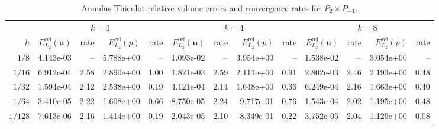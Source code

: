 \documentclass[10pt,a4paper]{article}
\begin{document}
\begin{table}[p]
\centering
\caption{Annulus Thieulot relative volume errors and convergence rates for $P_2\times P_{-1}$.}
\label{tab:annulus_thieulot_v2_p1_disc}
\small
\begin{tabular}{
r rr rr rr rr rr rr
}
\toprule
& \multicolumn{4}{c}{$k=1$} & \multicolumn{4}{c}{$k=4$} & \multicolumn{4}{c}{$k=8$} \\
\cmidrule(lr){2-5}\cmidrule(lr){6-9}\cmidrule(lr){10-13}
$h$ & $E_{L_2}^{\mathrm{rel}}(\mathbf{u})$ & rate & $E_{L_2}^{\mathrm{rel}}(p)$ & rate & $E_{L_2}^{\mathrm{rel}}(\mathbf{u})$ & rate & $E_{L_2}^{\mathrm{rel}}(p)$ & rate & $E_{L_2}^{\mathrm{rel}}(\mathbf{u})$ & rate & $E_{L_2}^{\mathrm{rel}}(p)$ & rate \\
\midrule
$1/8$ & 4.143e-03 & -- & 5.788e+00 & -- & 1.093e-02 & -- & 3.954e+00 & -- & 1.538e-02 & -- & 3.054e+00 & -- \\
$1/16$ & 6.912e-04 & 2.58 & 2.890e+00 & 1.00 & 1.821e-03 & 2.59 & 2.111e+00 & 0.91 & 2.802e-03 & 2.46 & 2.193e+00 & 0.48 \\
$1/32$ & 1.594e-04 & 2.12 & 2.538e+00 & 0.19 & 4.121e-04 & 2.14 & 1.648e+00 & 0.36 & 6.249e-04 & 2.16 & 1.663e+00 & 0.40 \\
$1/64$ & 3.410e-05 & 2.22 & 1.608e+00 & 0.66 & 8.750e-05 & 2.24 & 9.717e-01 & 0.76 & 1.543e-04 & 2.02 & 1.195e+00 & 0.48 \\
$1/128$ & 7.613e-06 & 2.16 & 1.414e+00 & 0.19 & 2.043e-05 & 2.10 & 8.349e-01 & 0.22 & 3.752e-05 & 2.04 & 1.129e+00 & 0.08 \\
\bottomrule
\end{tabular}
\end{table}
\end{document}
